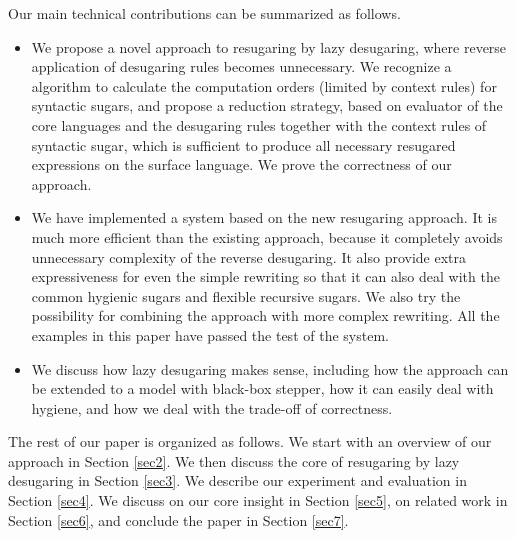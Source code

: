 Our main technical contributions can be summarized as follows.
\begin{itemize}
\item We propose a novel approach to resugaring by lazy desugaring, where reverse application of desugaring rules becomes unnecessary. We recognize a algorithm to calculate the computation orders (limited by context rules) for syntactic sugars, and propose a reduction strategy, based on evaluator of the core languages and the desugaring rules together with the context rules of syntactic sugar, which is sufficient to produce all necessary resugared expressions on the surface language. We prove the correctness of our approach.

\item We have implemented a system based on the new resugaring approach. It is much more efficient than the existing approach, because it completely avoids unnecessary complexity of the reverse desugaring. It also provide extra expressiveness for even the simple rewriting so that it can also deal with the common hygienic sugars and flexible recursive sugars. We also try the possibility for combining the approach with more complex rewriting. All the examples in this paper have passed the test of the system. 

\item We discuss how lazy desugaring makes sense, including how the approach can be extended to a model with black-box stepper, how it can easily deal with hygiene, and how we deal with the trade-off of correctness.


\end{itemize}

The rest of our paper is organized as follows. We start with an overview of our approach in Section \ref{sec2}. We then discuss the core of resugaring by lazy desugaring in Section \ref{sec3}. We describe our experiment and evaluation in Section \ref{sec4}. We discuss on our core insight in Section \ref{sec5}, on related work in Section \ref{sec6}, and conclude the paper in Section \ref{sec7}.
